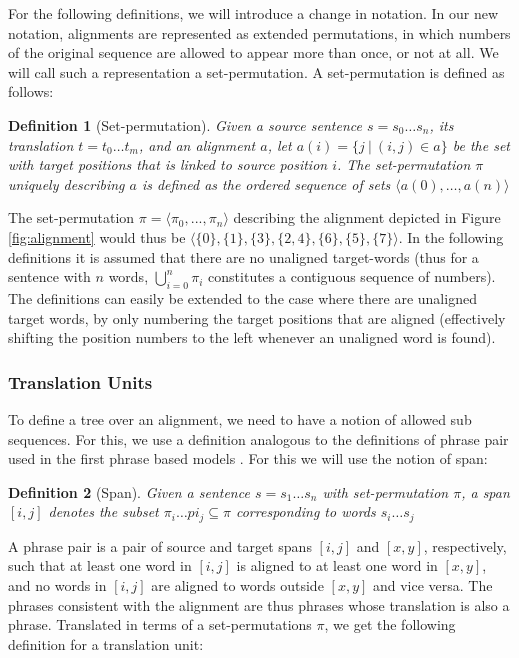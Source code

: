 \documentclass[a4paper, 11pt]{report}
\theoremstyle{definition}
\theoremstyle{plain}
\newtheorem{definition}{Definition}
\begin{document}
For the following definitions, we will introduce a change in notation. In our new notation, alignments are represented as extended permutations, in which numbers of the original sequence are allowed to appear more than once, or not at all. We will call such a representation a set-permutation. A set-permutation is defined as follows:

\begin{definition}[Set-permutation]
Given a source sentence $s = s_0 \ldots s_n$, its translation $t = t_0 \ldots t_m$, and an alignment $a$, let $a(i) = \{j~|~(i,j)\in a\}$ be the set with target positions that is linked to source position $i$. The set-permutation $\pi$ uniquely describing $a$ is defined as the ordered sequence of sets
$\langle a(0), \ldots, a(n) \rangle$
\end{definition}

The set-permutation $\pi = \langle\pi_0, ..., \pi_n\rangle$ describing the alignment depicted in Figure \ref{fig:alignment} would thus be $\langle \{0\}, \{1\}, \{3\}, \{2,4\}, \{6\}, \{5\}, \{7\}\rangle$. In the following definitions it is assumed that there are no unaligned target-words (thus for a sentence with $n$ words, $\bigcup_{i=0}^n \pi_i$ constitutes a contiguous sequence of numbers). The definitions can easily be extended to the case where there are unaligned target words, by only numbering the target positions that are aligned (effectively shifting the position numbers to the left whenever an unaligned word is found).

\subsubsection{Translation Units} To define a tree over an alignment, we need to have a notion of allowed sub sequences. For this, we use a definition analogous to the definitions of phrase pair used in the first phrase based models \citep{och2004alignment}. For this we will use the notion of span:

\begin{definition}[Span]
Given a sentence $s = s_1\ldots s_n$ with set-permutation $\pi$, a span $[i,j]$ denotes the subset $\pi_i\ldots pi_j\subseteq \pi$ corresponding to words $s_i\ldots s_j$
\end{definition}

A phrase pair is a pair of source and target spans $[i,j]$ and $[x,y]$, respectively, such that at least one word in $[i,j]$ is aligned to at least one word in $[x,y]$, and no words in $[i,j]$ are aligned to words outside $[x,y]$ and vice versa. The phrases consistent with the alignment are thus phrases whose translation is also a phrase. Translated in terms of a set-permutations $\pi$, we get the following definition for a translation unit:
\end{document}
